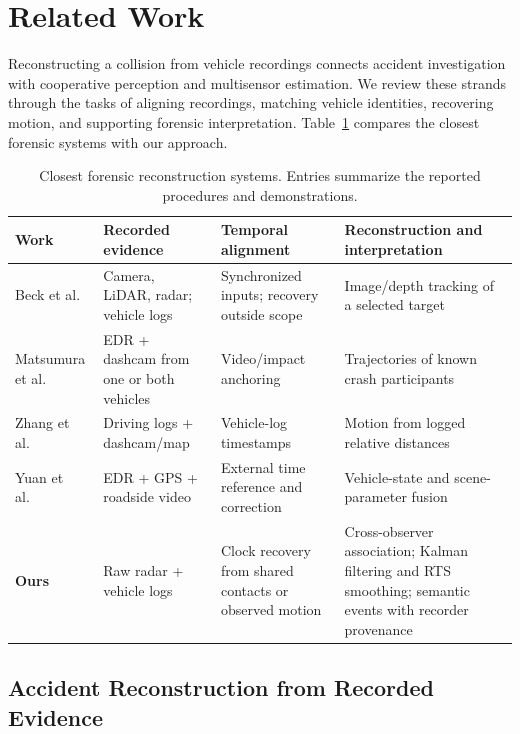 \section{Related Work}
\label{sec:related-work}

Reconstructing a collision from vehicle recordings connects accident
investigation with cooperative perception and multisensor estimation.
We review these strands through the tasks of aligning recordings,
matching vehicle identities, recovering motion, and supporting forensic
interpretation.
Table~\ref{tab:closest-reconstruction} compares the closest forensic systems
with our approach.

\begin{table}[!t]
\caption{Closest forensic reconstruction systems. Entries summarize the
reported procedures and demonstrations.}
\label{tab:closest-reconstruction}
\centering
\footnotesize
\renewcommand{\arraystretch}{1.15}
\begin{tabular*}{\textwidth}{@{\extracolsep{\fill}}p{}p{}p{}p{}@{}}
\hline
\textbf{Work} & \textbf{Recorded evidence} & \textbf{Temporal alignment} & \textbf{Reconstruction and interpretation} \\
\hline
Beck et al.~\cite{beck2023pipeline} &
Camera, LiDAR, radar; vehicle logs &
Synchronized inputs; recovery outside scope &
Image/depth tracking of a selected target \\
Matsumura et al.~\cite{matsumura2024precrash} &
EDR + dashcam from one or both vehicles &
Video/impact anchoring &
Trajectories of known crash participants \\
Zhang et al.~\cite{zhang2025reverse} &
Driving logs + dashcam/map &
Vehicle-log timestamps &
Motion from logged relative distances \\
Yuan et al.~\cite{yuan2026multisource} &
EDR + GPS + roadside video &
External time reference and correction &
Vehicle-state and scene-parameter fusion \\
\hline
\textbf{Ours} &
Raw radar + vehicle logs  &
Clock recovery from shared contacts or observed motion &
Cross-observer association; Kalman filtering and RTS smoothing;
semantic events with recorder provenance \\
\hline
\end{tabular*}
\end{table}

\subsection{Accident Reconstruction from Recorded Evidence}


